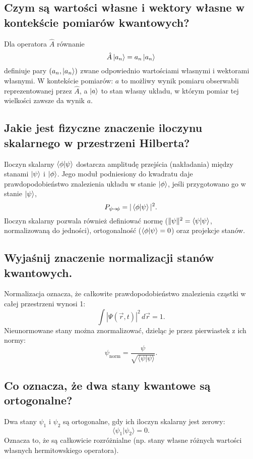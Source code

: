 \subsection{Czym są wartości własne i wektory własne w kontekście pomiarów kwantowych?}

Dla operatora $\hat A$ równanie
$$
\hat A\ket{a_n}=a_n\ket{a_n}
$$
definiuje pary $(a_n,\ket{a_n})$ zwane odpowiednio wartościami własnymi i wektorami własnymi. W kontekście pomiarów: $ a $ to możliwy wynik pomiaru obserwabli reprezentowanej przez $ \hat{A} $, a $ \ket{a} $ to stan własny układu, w którym pomiar tej wielkości zawsze da wynik $ a $.

\subsection{Jakie jest fizyczne znaczenie iloczynu skalarnego w przestrzeni Hilberta?}

Iloczyn skalarny $\braket{\phi}{\psi}$ dostarcza amplitudę przejścia (nakładania) między stanami $\ket{\psi}$ i $\ket{\phi}$. Jego moduł podniesiony do kwadratu daje prawdopodobieństwo znalezienia układu w stanie $\ket{\phi}$, jeśli przygotowano go w stanie $\ket{\psi}$,
$$
P_{\psi\!\to\!\phi}=|\braket{\phi}{\psi}|^{2}.
$$
Iloczyn skalarny pozwala również definiować normę ($\|\psi\|^{2}=\braket{\psi}{\psi}$, normalizowaną do jedności), ortogonalność ($\braket{\phi}{\psi}=0$) oraz projekcje stanów.

\subsection{Wyjaśnij znaczenie normalizacji stanów kwantowych.}

Normalizacja oznacza, że całkowite prawdopodobieństwo znalezienia cząstki w całej przestrzeni wynosi 1:
\[
\int |\Psi(\vec{r}, t)|^2 \, d\vec{r} = 1.
\]
Nieunormowane stany można znormalizować, dzieląc je przez pierwiastek z ich normy:  
\[
\psi_{\text{norm}} = \frac{\psi}{\sqrt{\langle \psi | \psi \rangle}}.
\]

\subsection{Co oznacza, że dwa stany kwantowe są ortogonalne?}

Dwa stany $\psi_1$ i $\psi_2$ są ortogonalne, gdy ich iloczyn skalarny jest zerowy:
\[
\langle \psi_1 | \psi_2 \rangle = 0.
\]
Oznacza to, że są całkowicie rozróżnialne (np. stany własne różnych wartości własnych hermitowskiego operatora).

